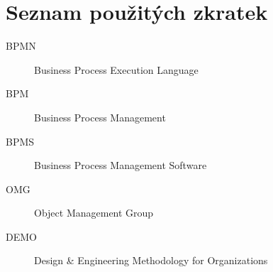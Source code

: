 \chapter{Seznam použitých zkratek}
\begin{description}
	\item[BPMN} Business Process Model and Notation
	\item[BPEL] Business Process Execution Language
	\item[BPM] Business Process Management
	\item[BPMS] Business Process Management Software
	\item[OMG] Object Management Group
	\item[DEMO] Design \& Engineering Methodology for Organizations
\end{description}